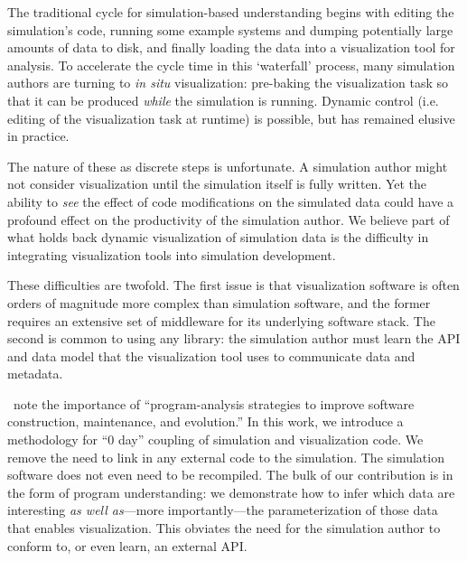 The traditional cycle for simulation-based understanding begins with
editing the simulation's code, running some example systems and dumping
potentially large amounts of data to disk, and finally loading the data
into a visualization tool for analysis.  To accelerate the cycle time
in this `waterfall' process, many simulation authors are turning to
\textit{in situ} visualization: pre-baking the visualization task so
that it can be
produced \emph{while} the simulation is running.  Dynamic control (i.e.
editing of the visualization task at runtime) is possible, but has
remained elusive in practice.

The nature of these as discrete steps is unfortunate.  A simulation
author might not consider visualization until the simulation
itself is fully written.  Yet the ability to \emph{see} the effect of
code modifications on the simulated data could have a profound effect
on the productivity of the simulation author.  We believe part of what
holds back dynamic visualization of simulation data is the difficulty
in integrating visualization tools into simulation development.

These difficulties are twofold.  The first issue is that visualization
software is often orders of magnitude more complex than simulation
software, and the former requires an extensive set of middleware for
its underlying software stack.  The second is common to using any
library: the simulation author must learn the API and data model that
the visualization tool uses to communicate data and metadata.

\cite{Hall:2009:Next50}~note the importance of ``program-analysis strategies to
improve software construction, maintenance, and evolution.''  In this
work, we introduce a methodology for ``0 day'' coupling of simulation
and visualization code.  We remove the need to link in any external
code to the simulation.  The simulation software does not even need to
be recompiled.  The bulk of our contribution is in the form of program
understanding: we demonstrate how to infer which data
are interesting \emph{as well as}---more importantly---the
parameterization of those data that enables visualization.  This
obviates the need for the simulation author to conform to, or even
learn, an external API.


